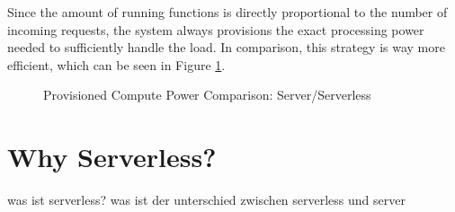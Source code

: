 Since the amount of running functions is directly proportional to the number of incoming requests, the system always provisions the exact processing power needed to sufficiently handle the load. In comparison, this strategy is way more efficient, which can be seen in Figure \ref{graph:provisionedComputePowerComparison}.

\begin{figure}[ht]
    \centering
    \caption {Provisioned Compute Power Comparison: Server/Serverless}
    \label{graph:provisionedComputePowerComparison}
\end{figure}



\section{Why Serverless?}


was ist serverless? was ist der unterschied zwischen serverless und server

